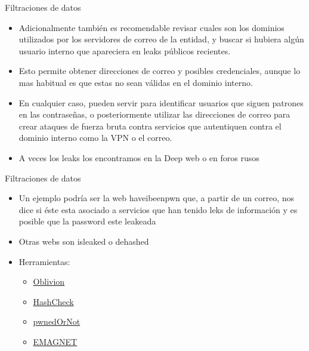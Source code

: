 \documentclass[aspectratio=169,11pt]{beamer}
\begin{document}
\begin{frame}[allowframebreaks]{Filtraciones de datos}
\small
  \begin{itemize}
  \item Adicionalmente también es recomendable revisar cuales son los dominios utilizados por los servidores de correo de la entidad, y buscar si hubiera algún usuario interno que apareciera en leaks públicos recientes.
  \item Esto permite obtener direcciones de correo y posibles credenciales, aunque lo mas habitual es que estas no sean válidas en el dominio interno.
  \item En cualquier caso, pueden servir para identificar usuarios que siguen patrones en las contraseñas, o posteriormente utilizar las direcciones de correo para crear ataques de fuerza bruta contra servicios que autentiquen contra el dominio interno como la VPN o el correo.
  \item A veces los leaks los encontramos en la Deep web o en foros rusos
  \end{itemize}
\end{frame}

\begin{frame}[allowframebreaks]{Filtraciones de datos}
\small
  \begin{itemize}
  \item Un ejemplo podría ser la web haveibeenpwn que, a partir de un correo, nos dice si éste esta asociado a servicios que han tenido leks de información y es posible que la password este leakeada
  \item Otras webs son isleaked o dehashed
  \item Herramientas:
    \begin{itemize}

  \item \href{https://github.com/loseys/Oblivion}{Oblivion}
  \item \href{https://github.com/Telefonica/HashCheck}{HashCheck}
  \item \href{https://github.com/thewhiteh4t/pwnedOrNot}{pwnedOrNot}
  \item \href{https://github.com/daab0x/EMAGNET}{EMAGNET}
    \end{itemize}


  \end{itemize}
\end{frame}
\end{document}
